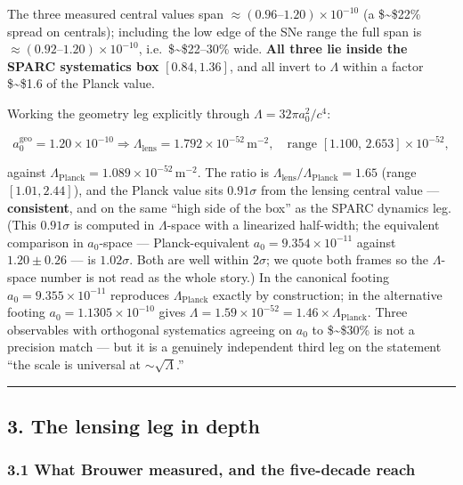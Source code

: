 \documentclass[
]{article}
\begin{document}
The three measured central values span
\(\approx(0.96\text{–}1.20)\times10^{-10}\) (a \$\sim\$22\% spread on
centrals); including the low edge of the SNe range the full span is
\(\approx(0.92\text{–}1.20)\times10^{-10}\), i.e.~\$\sim\$22--30\% wide.
\textbf{All three lie inside the SPARC systematics box} \([0.84,1.36]\),
and all invert to \(\Lambda\) within a factor \$\sim\$1.6 of the Planck
value.

Working the geometry leg explicitly through
\(\Lambda = 32\pi a_0^2/c^4\):

\[
a_0^\mathrm{geo} = 1.20\times10^{-10} \Rightarrow \Lambda_\mathrm{lens} = 1.792\times10^{-52}\,\mathrm{m^{-2}}, \quad \text{range } [1.100,\,2.653]\times10^{-52},
\]

against \(\Lambda_\mathrm{Planck} = 1.089\times10^{-52}\,\mathrm{m^{-2}}\).
The ratio is \(\Lambda_\mathrm{lens}/\Lambda_\mathrm{Planck} = 1.65\) (range
\([1.01,2.44]\)), and the Planck value sits \(0.91\sigma\) from the
lensing central value --- \textbf{consistent}, and on the same ``high
side of the box'' as the SPARC dynamics leg. (This \(0.91\sigma\) is
computed in \(\Lambda\)-space with a linearized half-width; the
equivalent comparison in \(a_0\)-space --- Planck-equivalent
\(a_0 = 9.354\times10^{-11}\) against \(1.20\pm0.26\) --- is
\(1.02\sigma\). Both are well within \(2\sigma\); we quote both frames
so the \(\Lambda\)-space number is not read as the whole story.) In the
canonical footing \(a_0=9.355\times10^{-11}\) reproduces
\(\Lambda_\mathrm{Planck}\) exactly by construction; in the alternative
footing \(a_0=1.1305\times10^{-10}\) gives
\(\Lambda=1.59\times10^{-52} = 1.46\times\Lambda_\mathrm{Planck}\). Three
observables with orthogonal systematics agreeing on \(a_0\) to
\$\sim\$30\% is not a precision match --- but it is a genuinely
independent third leg on the statement ``the scale is universal at
\(\sim\!\sqrt\Lambda\).''

\begin{center}\rule{0.5\linewidth}{0.5pt}\end{center}

\subsection{3. The lensing leg in depth}\label{the-lensing-leg-in-depth}

\subsubsection{3.1 What Brouwer measured, and the five-decade
reach}\label{what-brouwer-measured-and-the-five-decade-reach}
\end{document}
